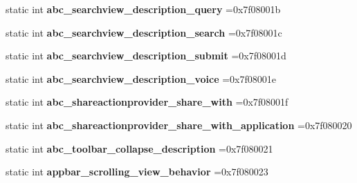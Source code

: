\begin{DoxyCompactItemize}
static int {\bfseries abc\+\_\+searchview\+\_\+description\+\_\+query} =0x7f08001b
\item 
\mbox{\label{classandroid_1_1support_1_1design_1_1R_1_1string_a28e4786b806782486b8bf2ff9773399c}} 
static int {\bfseries abc\+\_\+searchview\+\_\+description\+\_\+search} =0x7f08001c
\item 
\mbox{\label{classandroid_1_1support_1_1design_1_1R_1_1string_a31ddb748289b8aab0e79c0724e9b2237}} 
static int {\bfseries abc\+\_\+searchview\+\_\+description\+\_\+submit} =0x7f08001d
\item 
\mbox{\label{classandroid_1_1support_1_1design_1_1R_1_1string_a82766529524c552220dbd1805feac338}} 
static int {\bfseries abc\+\_\+searchview\+\_\+description\+\_\+voice} =0x7f08001e
\item 
\mbox{\label{classandroid_1_1support_1_1design_1_1R_1_1string_ab4b6797b472a7d511f4d59789f03c8d9}} 
static int {\bfseries abc\+\_\+shareactionprovider\+\_\+share\+\_\+with} =0x7f08001f
\item 
\mbox{\label{classandroid_1_1support_1_1design_1_1R_1_1string_a350002dbdb8f6fc7e5739e7cf5f1d93f}} 
static int {\bfseries abc\+\_\+shareactionprovider\+\_\+share\+\_\+with\+\_\+application} =0x7f080020
\item 
\mbox{\label{classandroid_1_1support_1_1design_1_1R_1_1string_a59c66a6f80f9dead4203d8cfed67d289}} 
static int {\bfseries abc\+\_\+toolbar\+\_\+collapse\+\_\+description} =0x7f080021
\item 
\mbox{\label{classandroid_1_1support_1_1design_1_1R_1_1string_a629b4ba8b7f7b704f97a39a8921e70fc}} 
static int {\bfseries appbar\+\_\+scrolling\+\_\+view\+\_\+behavior} =0x7f080023
\item 
\mbox{\label{classandroid_1_1support_1_1design_1_1R_1_1string_a5205e9f464875ba705bffc3ed6dc1622}} 

\end{DoxyCompactItemize}
